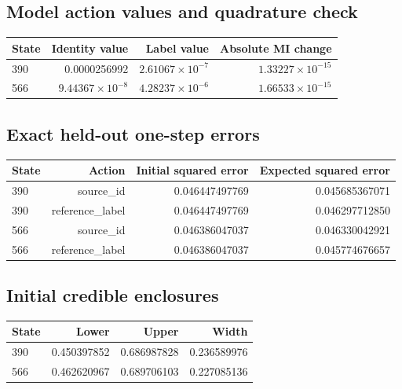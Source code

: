 \reservetable
\subsection{Model action values and quadrature check}

\begingroup\small
\setlength{\tabcolsep}{4pt}
\begin{longtable}{lrrr}
\toprule

State & Identity value & Label value & Absolute MI change\\\midrule\endhead

390 & 0.0000256992 & $2.61067\times10^{-7}$ & $1.33227\times10^{-15}$\\

566 & $9.44367\times10^{-8}$ & $4.28237\times10^{-6}$ & $1.66533\times10^{-15}$\\

\bottomrule
\end{longtable}
\endgroup

\reservetable
\subsection{Exact held-out one-step errors}

\begingroup\small
\setlength{\tabcolsep}{4pt}
\begin{longtable}{lrrr}
\toprule

State & Action & Initial squared error & Expected squared error\\\midrule\endhead

390 & source\_id & 0.046447497769 & 0.045685367071\\

390 & reference\_label & 0.046447497769 & 0.046297712850\\

566 & source\_id & 0.046386047037 & 0.046330042921\\

566 & reference\_label & 0.046386047037 & 0.045774676657\\

\bottomrule
\end{longtable}
\endgroup

\reservetable
\subsection{Initial credible enclosures}

\begingroup\small
\setlength{\tabcolsep}{4pt}
\begin{longtable}{lrrr}
\toprule

State & Lower & Upper & Width\\\midrule\endhead

390 & 0.450397852 & 0.686987828 & 0.236589976\\

566 & 0.462620967 & 0.689706103 & 0.227085136\\

\bottomrule
\end{longtable}
\endgroup

